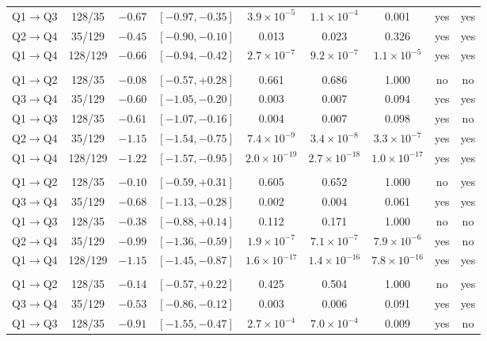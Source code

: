 \begin{longtable}{lcrcccccc}
\quad Q1$\to$Q3 & 128/35 & $-0.67$ & $[-0.97, -0.35]$ & $3.9\times10^{-5}$ & $1.1\times10^{-4}$ & 0.001 & yes & yes \\
\quad Q2$\to$Q4 & 35/129 & $-0.45$ & $[-0.90, -0.10]$ & 0.013 & 0.023 & 0.326 & yes & yes \\
\quad Q1$\to$Q4 & 128/129 & $-0.66$ & $[-0.94, -0.42]$ & $2.7\times10^{-7}$ & $9.2\times10^{-7}$ & $1.1\times10^{-5}$ & yes & yes \\
\addlinespace[3pt]
\multicolumn{9}{l}{\textbf{Bridges}} \\*
\quad Q1$\to$Q2 & 128/35 & $-0.08$ & $[-0.57, +0.28]$ & 0.661 & 0.686 & 1.000 & no & no \\
\quad Q3$\to$Q4 & 35/129 & $-0.60$ & $[-1.05, -0.20]$ & 0.003 & 0.007 & 0.094 & yes & yes \\
\quad Q1$\to$Q3 & 128/35 & $-0.61$ & $[-1.07, -0.16]$ & 0.004 & 0.007 & 0.098 & yes & no \\
\quad Q2$\to$Q4 & 35/129 & $-1.15$ & $[-1.54, -0.75]$ & $7.4\times10^{-9}$ & $3.4\times10^{-8}$ & $3.3\times10^{-7}$ & yes & yes \\
\quad Q1$\to$Q4 & 128/129 & $-1.22$ & $[-1.57, -0.95]$ & $2.0\times10^{-19}$ & $2.7\times10^{-18}$ & $1.0\times10^{-17}$ & yes & yes \\
\addlinespace[3pt]
\multicolumn{9}{l}{\textbf{Degree bimodality ($D_{bi}$)}} \\*
\quad Q1$\to$Q2 & 128/35 & $-0.10$ & $[-0.59, +0.31]$ & 0.605 & 0.652 & 1.000 & no & yes \\
\quad Q3$\to$Q4 & 35/129 & $-0.68$ & $[-1.13, -0.28]$ & 0.002 & 0.004 & 0.061 & yes & yes \\
\quad Q1$\to$Q3 & 128/35 & $-0.38$ & $[-0.88, +0.14]$ & 0.112 & 0.171 & 1.000 & no & no \\
\quad Q2$\to$Q4 & 35/129 & $-0.99$ & $[-1.36, -0.59]$ & $1.9\times10^{-7}$ & $7.1\times10^{-7}$ & $7.9\times10^{-6}$ & yes & no \\
\quad Q1$\to$Q4 & 128/129 & $-1.15$ & $[-1.45, -0.87]$ & $1.6\times10^{-17}$ & $1.4\times10^{-16}$ & $7.8\times10^{-16}$ & yes & yes \\
\addlinespace[3pt]
\multicolumn{9}{l}{\textbf{Degree heterogeneity ($\sigma_k$)}} \\*
\quad Q1$\to$Q2 & 128/35 & $-0.14$ & $[-0.57, +0.22]$ & 0.425 & 0.504 & 1.000 & no & yes \\
\quad Q3$\to$Q4 & 35/129 & $-0.53$ & $[-0.86, -0.12]$ & 0.003 & 0.006 & 0.091 & yes & yes \\
\quad Q1$\to$Q3 & 128/35 & $-0.91$ & $[-1.55, -0.47]$ & $2.7\times10^{-4}$ & $7.0\times10^{-4}$ & 0.009 & yes & no \\

\end{longtable}
